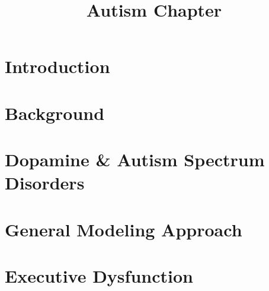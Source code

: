 \documentclass[man]{apa}
\title{Autism Chapter}
\begin{document}
\maketitle 

%
% 
% 


\section{Introduction}
\label{section:introduction}




\section{Background}
\label{section:background}




\section{Dopamine \& Autism Spectrum Disorders}
\label{section:hypothesis}




\section{General Modeling Approach}
\label{section:approach}




\section{Executive Dysfunction}
\label{section:executive}


\end{document}

